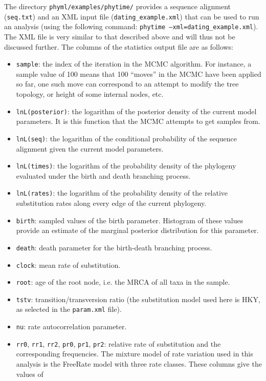 \documentclass[a4paper,12pt]{article}
\newcommand{\x}[1]{\texttt{#1}}
\begin{document}
The directory \x{phyml/examples/phytime/} provides a sequence alignment (\x{seq.txt}) and an XML
input file (\x{dating\_example.xml}) that can be used to run an analysis (using the following command:
\x{phytime --xml=dating\_example.xml}). The XML file is very similar to that described above and will thus not
be discussed further. The columns of the statistics output file are as follows:
\begin{itemize}
\item \x{sample}: the index of the iteration in the MCMC algorithm. For instance, a sample value of
  100 means that 100 ``moves'' in the MCMC have been applied so far, one such move can correspond to
  an attempt to modify the tree topology, or  height of some internal nodes, etc.
\item \x{lnL(posterior)}: the logarithm of the posterior density of the current model parameters. It is this function
  that the MCMC attempts to get samples from.
\item \x{lnL(seq)}: the logarithm of the conditional probability of the sequence alignment given the current model
  parameters.
\item \x{lnL(times)}: the logarithm of the probability density of the phylogeny evaluated under the
  birth and death branching process.
\item \x{lnL(rates)}: the logarithm of the probability density of the relative substitution rates
  along every edge of the current phylogeny.
\item \x{birth}: sampled values of the birth parameter. Histogram of these values provide an
  estimate of the marginal posterior distribution for this parameter.
\item \x{death}: death parameter for the birth-death branching process.
\item \x{clock}: mean rate of substitution.
\item \x{root}: age of the root node, i.e. the MRCA of all taxa in the sample.
\item \x{tstv}: transition/transversion ratio (the substitution model used
  here is HKY, as selected in the \x{param.xml} file).
\item \x{nu}: rate autocorrelation parameter.
\item \x{rr0}, \x{rr1}, \x{rr2}, \x{pr0}, \x{pr1}, \x{pr2}: relative rate of substitution and the
  corresponding frequencies. The mixture model of rate variation used in this analysis is the
  FreeRate model \cite{soubrier12} with three rate classes. These  columns give the values of

\end{itemize}
\end{document}
